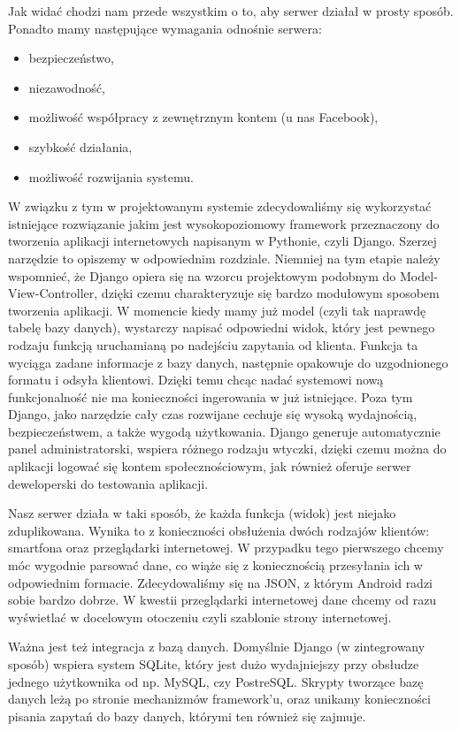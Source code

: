 \documentclass[12pt,titlepage]{article}
\begin{document}
Jak widać chodzi nam przede wszystkim o to, aby serwer działał w prosty sposób. Ponadto mamy następujące wymagania odnośnie serwera:

\begin{itemize}
 \item bezpieczeństwo,
 \item niezawodność,
 \item możliwość współpracy z zewnętrznym kontem (u nas Facebook),
 \item szybkość działania,
 \item możliwość rozwijania systemu.
\end{itemize}

W związku z tym w projektowanym systemie zdecydowaliśmy się wykorzystać istniejące rozwiązanie jakim jest wysokopoziomowy framework przeznaczony do tworzenia aplikacji internetowych napisanym w Pythonie,
czyli Django. Szerzej narzędzie to opiszemy w odpowiednim rozdziale. Niemniej na tym etapie należy wspomnieć, że Django opiera się na wzorcu projektowym podobnym do Model-View-Controller,
dzięki czemu charakteryzuje się bardzo modułowym sposobem tworzenia aplikacji.
W momencie kiedy mamy już model (czyli tak naprawdę tabelę bazy danych), wystarczy napisać odpowiedni widok, który jest pewnego rodzaju funkcją uruchamianą po nadejściu zapytania od klienta.
Funkcja ta wyciąga zadane informacje z bazy danych, następnie opakowuje do uzgodnionego formatu i odsyła klientowi. Dzięki temu chcąc nadać systemowi nową funkcjonalność nie ma konieczności
ingerowania w już istniejące. Poza tym Django, jako narzędzie cały czas rozwijane cechuje się wysoką wydajnością, bezpieczeństwem, a także wygodą użytkowania. Django generuje automatycznie panel
administratorski, wspiera różnego rodzaju wtyczki, dzięki czemu można do aplikacji logować się kontem społecznościowym, jak również oferuje serwer deweloperski do testowania aplikacji.

Nasz serwer działa w taki sposób, że każda funkcja (widok) jest niejako zduplikowana. Wynika to z konieczności obsłużenia dwóch rodzajów klientów: smartfona oraz przeglądarki internetowej.
W przypadku tego pierwszego chcemy móc wygodnie parsować dane, co wiąże się z koniecznością przesyłania ich w odpowiednim formacie. Zdecydowaliśmy się na JSON, z którym Android radzi sobie bardzo dobrze.
W kwestii przeglądarki internetowej dane chcemy od razu wyświetlać w docelowym otoczeniu czyli szablonie strony internetowej.

Ważna jest też integracja z bazą danych. Domyślnie Django (w zintegrowany sposób) wspiera system SQLite, który jest dużo wydajniejszy przy obsłudze jednego użytkownika od np. MySQL, czy PostreSQL.
Skrypty tworzące bazę danych leżą po stronie mechanizmów framework'u, oraz unikamy konieczności pisania zapytań do bazy danych, którymi ten również się zajmuje.
\end{document}
